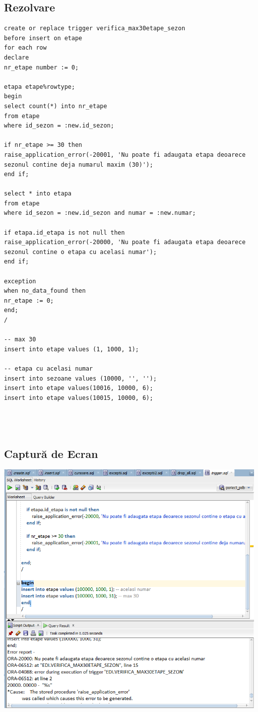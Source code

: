 \documentclass{article}
\begin{document}
\subsection{Rezolvare}
\begin{lstlisting}
create or replace trigger verifica_max30etape_sezon
before insert on etape
for each row
declare
nr_etape number := 0;

etapa etape%rowtype;
begin
select count(*) into nr_etape
from etape 
where id_sezon = :new.id_sezon;

if nr_etape >= 30 then
raise_application_error(-20001, 'Nu poate fi adaugata etapa deoarece sezonul contine deja numarul maxim (30)');
end if;

select * into etapa
from etape
where id_sezon = :new.id_sezon and numar = :new.numar;

if etapa.id_etapa is not null then
raise_application_error(-20000, 'Nu poate fi adaugata etapa deoarece sezonul contine o etapa cu acelasi numar');
end if;

exception
when no_data_found then
nr_etape := 0;
end;
/

-- max 30
insert into etape values (1, 1000, 1); 

-- etapa cu acelasi numar
insert into sezoane values (10000, '', '');
insert into etape values(10016, 10000, 6);
insert into etape values(10015, 10000, 6);




\end{lstlisting}
\subsection{Captură de Ecran}
\includegraphics[width=40em, keepaspectratio]{trigger_lmd_linie}
\pagebreak
\end{document}
